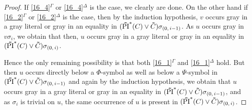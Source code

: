 \begin{proof}
	If \ref{16_4}$^\Gamma$ or \ref{16_4}$^\Delta$ is the case, we clearly are done.
	On the other hand if \ref{16_2}$^\Gamma$ or \ref{16_2}$^\Delta$ is the case, then by the induction hypothesis, $v$ occurs gray in a gray literal or gray in an equality in $(\bm\tilde{\operatorname{PI}}^{*}(C)\lor \bm\tilde{C})\sigma_{(0,\,i-1)}$. 
	As $u$ occurs gray in $v\sigma_i$, we obtain that then, $u$ occurs gray in a gray literal or gray in an equality in $(\bm\tilde{\operatorname{PI}}^{*}(C)\lor \bm\tilde{C})\sigma_{(0,\,i)}$.

	Hence the only remaining possibility is that both \ref{16_1}$^\Gamma$
	and \ref{16_1}$^\Delta$ hold.
	But then $u$ occurs directly below a $\Phi$-symbol as well as below a $\Psi$-symbol in $(\bm\tilde{\operatorname{PI}}^{*}(C)\lor \bm\tilde{C})\sigma_{(0,\,i-1)}$ and again by the induction hypothesis, we obtain that $u$ occurs gray in a gray literal or gray in an equality in $(\bm\tilde{\operatorname{PI}}^{*}(C)\lor \bm\tilde{C})\sigma_{(0,\,i-1)}$, and as $\sigma_i$ is trivial on $u$, the same occurrence of $u$ is present in $(\bm\tilde{\operatorname{PI}}^{*}(C)\lor \bm\tilde{C})\sigma_{(0,\,i)}$.
\end{proof}



